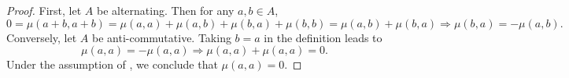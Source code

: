 \begin{proof}
  First, let $A$ be alternating.
  Then for any $a, b \in A$,
  \begin{equation}
    0 = \mu(a + b, a + b)
    = \mu(a, a) + \mu(a, b) + \mu(b, a) + \mu(b, b)
    = \mu(a, b) + \mu(b, a)
    \Rightarrow \mu(b, a) = - \mu(a, b).
  \end{equation}
  Conversely, let $A$ be anti-commutative. Taking $b = a$ in the definition
  leads to
  \begin{equation}
    \mu(a, a) = - \mu(a, a) \Rightarrow \mu(a, a) + \mu(a, a) = 0.
  \end{equation}
  Under the assumption of
  ,
  we conclude that $\mu(a, a) = 0$.
\end{proof}

